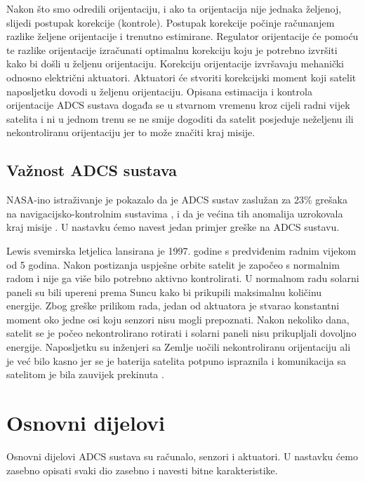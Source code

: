 \documentclass[times, utf8, diplomski, numeric]{templates/template}
\begin{document}
{{{            Nakon što smo odredili orijentaciju, i ako ta orijentacija nije jednaka željenoj, slijedi postupak korekcije (kontrole). Postupak korekcije počinje računanjem razlike željene orijentacije i trenutno estimirane. Regulator orijentacije će pomoću te razlike orijentacije izračunati optimalnu korekciju koju je potrebno izvršiti kako bi došli u željenu orijentaciju. Korekciju orijentacije izvršavaju mehanički odnosno električni aktuatori. Aktuatori će stvoriti korekcijski moment koji satelit naposljetku dovodi u željenu orijentaciju.
            Opisana estimacija i kontrola orijentacije ADCS sustava događa se u stvarnom vremenu kroz cijeli radni vijek satelita i ni u jednom trenu se ne smije dogoditi da satelit posjeduje neželjenu ili nekontroliranu orijentaciju jer to može značiti kraj misije.
        }

        \subsection{Važnost ADCS sustava}{
            NASA-ino istraživanje je pokazalo da je ADCS sustav zaslužan za 23\% grešaka na navigacijsko-kontrolnim sustavima , i da je većina tih anomalija uzrokovala kraj misije \cite{greskeNaAdcsPostotak}. U nastavku ćemo navest jedan primjer greške na ADCS sustavu.
    
            Lewis svemirska letjelica \cite{lewis} lansirana je 1997. godine s predviđenim radnim vijekom od 5 godina. Nakon postizanja uspješne orbite satelit je započeo s normalnim radom i nije ga više bilo potrebno aktivno kontrolirati. U normalnom radu solarni paneli su bili upereni prema Suncu kako bi prikupili maksimalnu količinu energije. Zbog greške prilikom rada, jedan od aktuatora je stvarao konstantni moment oko jedne osi koju senzori nisu mogli prepoznati. Nakon nekoliko dana, satelit se je počeo nekontrolirano rotirati i solarni paneli nisu prikupljali dovoljno energije. Naposljetku su inženjeri sa Zemlje uočili nekontroliranu orijentaciju ali je već bilo kasno jer se je baterija satelita potpuno ispraznila i komunikacija sa satelitom je bila zauvijek prekinuta \cite{greskeNaAdcsSlucajevi}.
        }
    }

    \section{Osnovni dijelovi}{
        Osnovni dijelovi ADCS sustava su računalo, senzori i aktuatori. U nastavku ćemo zasebno opisati svaki dio zasebno i navesti bitne karakteristike.
 
}}
\end{document}
